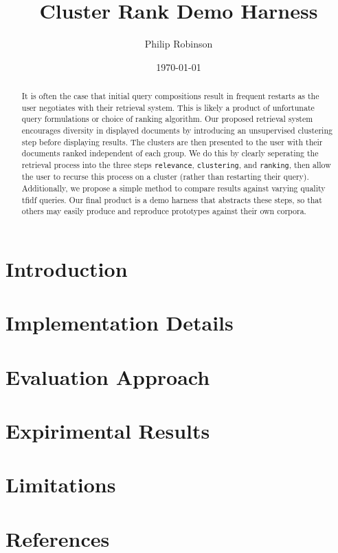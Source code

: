 \documentclass[10pt,twocolumn]{article} %
\title{Cluster Rank Demo Harness}
\date{\today}
\author{Philip Robinson}
\affil{Oregon Health Sciences University}
\begin{document}
\maketitle
{}
\begin{abstract}
  It is often the case that initial query compositions result in frequent restarts as
  the user negotiates with their retrieval system. This is likely a product of unfortunate
  query formulations or choice of ranking algorithm. Our proposed retrieval system
  encourages diversity in displayed documents by introducing an unsupervised clustering
  step before displaying results. The clusters are then presented to the user with their
  documents ranked independent of each group. We do this by clearly seperating the
  retrieval process into the three steps \texttt{relevance}, \texttt{clustering}, and
  \texttt{ranking}, then allow the user to recurse this process on a cluster (rather
  than restarting their query). Additionally, we propose a simple method to
  compare results against varying quality tfidf queries. Our final product is a demo
  harness that abstracts these steps, so that others may easily produce and reproduce
  prototypes against their own corpora.
\end{abstract}

\section{Introduction}
\section{Implementation Details}
\section{Evaluation Approach}
\section{Expirimental Results}
\section{Limitations}
\section{References}
\end{document}

